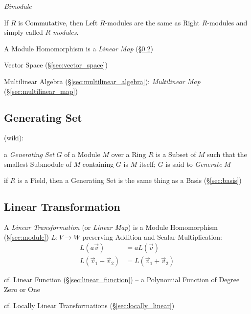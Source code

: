 \emph{Bimodule}

If $R$ is Commutative, then Left $R$-modules are the same as Right
$R$-modules and simply called \emph{$R$-modules}.

A Module Homomorphism is a \emph{Linear Map} (\S\ref{sec:linear_transformation})

Vector Space (\S\ref{sec:vector_space})

Multilinear Algebra (\S\ref{sec:multilinear_algebra}):
\emph{Multilinear Map} (\S\ref{sec:multilinear_map})



\subsection{Generating Set}\label{sec:generating_set}

(wiki):

a \emph{Generating Set} $G$ of a Module $M$ over a Ring $R$ is a Subset of $M$
such that the smallest Submodule of $M$ containing $G$ is $M$ itself; $G$ is
said to \emph{Generate} $M$

if $R$ is a Field, then a Generating Set is the same thing as a Basis
(\S\ref{sec:basis})



\subsection{Linear Transformation}\label{sec:linear_transformation}

A \emph{Linear Transformation} (or \emph{Linear Map}) is a Module Homomorphism
(\S\ref{sec:module}) $L : V \rightarrow W$ preserving Addition and Scalar
Multiplication:
\begin{align*}
  L(a\vec{v})              & = aL(\vec{v}) \\
  L(\vec{v}_1 + \vec{v}_2) & = L(\vec{v}_1 + \vec{v}_2)
\end{align*}

\fist cf. Linear Function (\S\ref{sec:linear_function}) -- a Polynomial
Function of Degree Zero or One

\fist cf. Locally Linear Transformations (\S\ref{sec:locally_linear})

